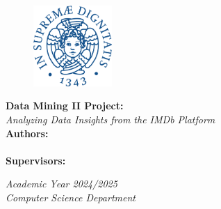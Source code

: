 \documentclass[a4paper,10pt]{article}
\begin{document}
\begin{titlepage}
\setcounter{page}{0} %
\begin{figure}[htp]
\centering
\includegraphics[width=3cm]{cherubino_pant541.pdf} %
\end{figure}

\vspace{2cm} %

\begin{center}
\textbf{\fontsize{18pt}{10pt}\selectfont Data Mining II Project:}\\
\vspace{0.5cm}
\textit{\fontsize{16pt}{10pt}\selectfont Analyzing Data Insights from the IMDb Platform}\\

\vspace{1cm} %
\textbf{Authors:}\\
\vspace{0.3cm}
\\
\vspace{1cm}
\textbf{Supervisors:}\\
\vspace{0.3cm}




\vspace{9cm} %
\textit{Academic Year 2024/2025}\\
\vspace{0.3cm}
\textit{Computer Science Department}
\end{center}

\end{titlepage}


\tableofcontents

\clearpage















\end{document}
